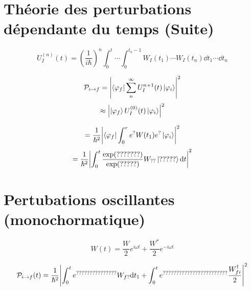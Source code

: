 



\section*{Théorie des perturbations dépendante du temps (Suite)}

$$U_{I}^{(n)} (t)  = \left( \frac{1}{i\hbar}  \right)^n \int_{0}^t \dotsb \int_{0}^{t_n-1} W_{I} (t_{1} ) \dotsb W_I(t_n) \dd t_{1} \dotsb \dd t_{n}   $$ 


$$\mathcal{P}_{i \to f}  = \abs{\bra{\varphi_f} \sum_{n}^\infty U_{I}^{n+1} (t) \ket{\varphi_{i} }}^2$$ 
$$\approx \abs{\ket{\varphi_f} U_{I}^{(0)} (t) \ket{\varphi_{i}}}^2$$ 

$$ = \frac{1}{\hbar^2} \abs{\bra{\varphi_f}\int_{0}^r e^{?} W(t_1) e^{?} \ket{\varphi_i}}^2$$ 
$$=\frac{1}{\hbar^2} \abs{\int_{0}^t \frac{\exp(???????)}{\exp(?????)} W_{??} \ket{?????} \dd t}^2$$ 

\section*{Pertubations oscillantes (monochormatique)}


$$W(t) = \frac{W}{2} e^{i\omega t} + \frac{W^*}{2} e^{-i\omega t}$$ 

$$\mathcal{P}_{i \to f}(t) = \frac{1}{\hbar^2} \abs{\int_{0}^t e^{???????????????} W_{f?} \dd t_{1} + \int_{0}^t e^{????????????????????????} \frac{W_{fi}^\dagger}{2} }^2$$ 


	

